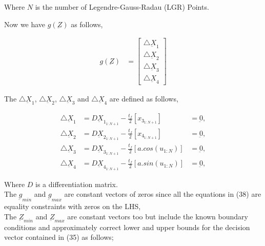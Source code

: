 \documentclass[11pt,usenames]{article}
\begin{document}
	Where $N$ is the number of Legendre-Gauss-Radau (LGR) Points.
	
	Now we have $g( \underbar Z )$ as follows,
	
	\begin{align}
	g( \underbar Z ) &= 
	\begin{bmatrix}
	\bigtriangleup \underbar X_{1} \\  \bigtriangleup \underbar X_{2} \\ \bigtriangleup \underbar X_{3} \\  \bigtriangleup \underbar X_{4}
	\end{bmatrix}
	\end{align}
	
	The $\bigtriangleup \underbar X_{1}$, $\bigtriangleup \underbar X_{2}$, $\bigtriangleup \underbar X_{3}$ and $\bigtriangleup \underbar X_{4}$ are defined as follows,
	
	\begin{align}
	\bigtriangleup \underbar X_{1} &= D \underbar X_{1_{1:N+1} } - \frac{t_{f}}{2} \left[ x_{3_{1:N+1}} \right] &= \underbar 0, \nonumber \\
	\bigtriangleup \underbar X_{2} &= D \underbar X_{2_{1:N+1}} - \frac{t_{f}}{2} \left[ x_{4_{1:N+1}} \right]  &= \underbar 0,  \\
	\bigtriangleup \underbar X_{3} &= D \underbar X_{3_{1:N+1}} - \frac{t_{f}}{2} \left[ a.cos(u_{1:N}) \right]   &= \underbar 0, \nonumber \\
	\bigtriangleup \underbar X_{4} &= D \underbar X_{4_{1:N+1}} - \frac{t_{f}}{2} \left[ a.sin(u_{1:N}) \right]  &= \underbar 0, \nonumber 
	\end{align}
	
	Where $D$ is a differentiation matrix.\\
	
	The $ \underbar g_{min}$ and $ \underbar g_{max} $ are constant vectors of zeros since all the equations in (38) are equality constraints with zeros on the LHS, \\
	
	The $ \underbar Z_{min}$ and $ \underbar Z_{max} $ are constant vectors too but include the known boundary conditions and approximately correct lower and upper bounds for the decision vector contained in (35) as follows;
	
\end{document}
